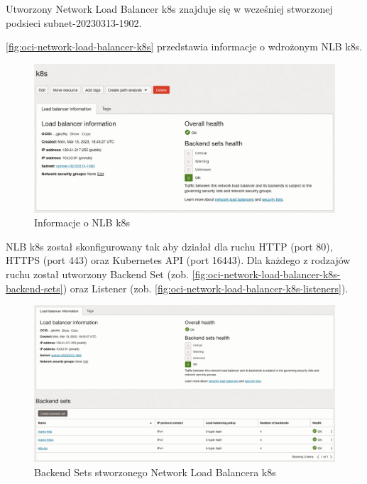 Utworzony Network Load Balancer k8s znajduje się w wcześniej stworzonej podsieci subnet-20230313-1902.

\autoref{fig:oci-network-load-balancer-k8s} przedstawia informacje o wdrożonym NLB k8s.

\begin{figure}[H]
    \centering
    \includegraphics[width=\textwidth]{img/oci-network-load-balancer-k8s}
    \caption{Informacje o NLB k8s}
    \label{fig:oci-network-load-balancer-k8s}
\end{figure}

NLB k8s został skonfigurowany tak aby działał dla ruchu HTTP (port 80), HTTPS (port 443) oraz Kubernetes API (port 16443).
Dla każdego z rodzajów ruchu został utworzony Backend Set (zob. \autoref{fig:oci-network-load-balancer-k8s-backend-sets}) oraz Listener (zob. \autoref{fig:oci-network-load-balancer-k8s-listeners}).

\begin{figure}[H]
    \centering
    \includegraphics[width=\textwidth]{img/oci-network-load-balancer-k8s-backend-sets}
    \caption{Backend Sets stworzonego Network Load Balancera k8s}
    \label{fig:oci-network-load-balancer-k8s-backend-sets}
\end{figure}

